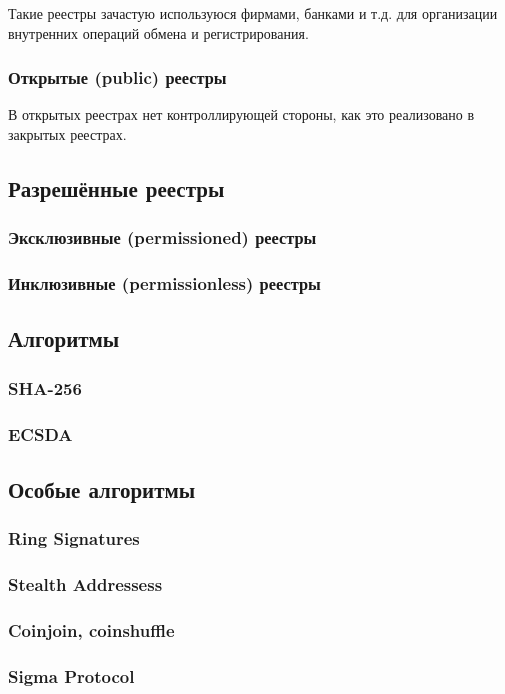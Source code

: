 Такие реестры зачастую используюся фирмами, банками и т.д. для организации
внутренних операций обмена и регистрирования.

\subsubsection{Открытые (public) реестры}
В открытых реестрах нет контроллирующей стороны, как это реализовано в закрытых реестрах. 

\subsection{Разрешённые реестры}
\subsubsection{Эксклюзивные (permissioned) реестры}
\subsubsection{Инклюзивные (permissionless) реестры}


\subsection{Алгоритмы}
\subsubsection{SHA-256}
\subsubsection{ECSDA}


\subsection{Особые алгоритмы}
\subsubsection{Ring Signatures}
\subsubsection{Stealth Addressess}
\subsubsection{Coinjoin, coinshuffle}
\subsubsection{Sigma Protocol}
